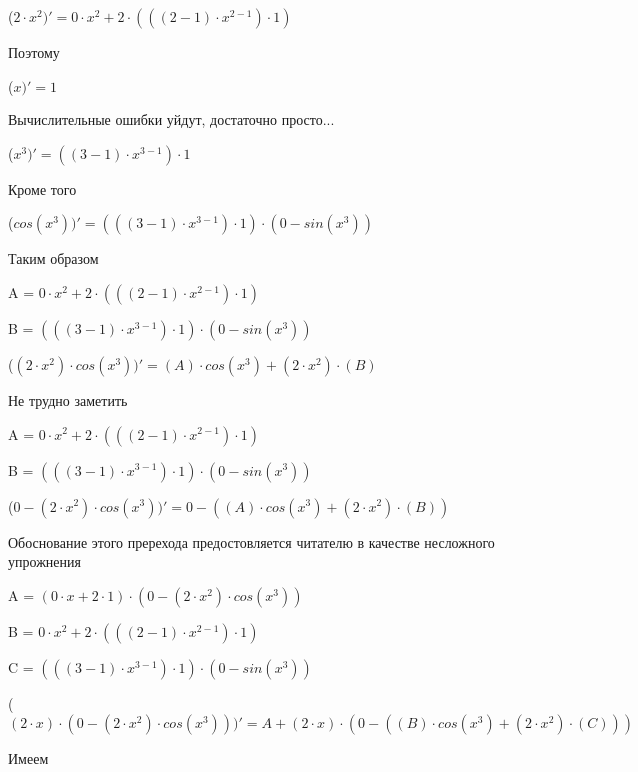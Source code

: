 \documentclass[12pt,a4paper,fleqn]{article}
\begin{document}
\begin{center}
 ($2 \cdot x^{2})'
  = 0 \cdot x^{2}+2 \cdot (((2-1) \cdot x^{2-1}) \cdot 1)$\end{center}
Поэтому

\begin{center}
 ($x)'
  = 1$\end{center}
Вычислительные ошибки уйдут, достаточно просто...

\begin{center}
 ($x^{3})'
  = ((3-1) \cdot x^{3-1}) \cdot 1$\end{center}
Кроме того

\begin{center}
 ($cos(x^{3}))'
  = (((3-1) \cdot x^{3-1}) \cdot 1) \cdot (0-sin(x^{3}))$\end{center}
Таким образом

\begin{center}
A = $0 \cdot x^{2}+2 \cdot (((2-1) \cdot x^{2-1}) \cdot 1)$\end{center}
\begin{center}
B = $(((3-1) \cdot x^{3-1}) \cdot 1) \cdot (0-sin(x^{3}))$\end{center}
\begin{center}
 ($(2 \cdot x^{2}) \cdot cos(x^{3}))'
  = (A) \cdot cos(x^{3})+(2 \cdot x^{2}) \cdot (B)$\end{center}
Не трудно заметить

\begin{center}
A = $0 \cdot x^{2}+2 \cdot (((2-1) \cdot x^{2-1}) \cdot 1)$\end{center}
\begin{center}
B = $(((3-1) \cdot x^{3-1}) \cdot 1) \cdot (0-sin(x^{3}))$\end{center}
\begin{center}
 ($0-(2 \cdot x^{2}) \cdot cos(x^{3}))'
  = 0-((A) \cdot cos(x^{3})+(2 \cdot x^{2}) \cdot (B))$\end{center}
Обоснование этого пререхода предостовляется читателю в качестве несложного упрожнения

\begin{center}
A = $(0 \cdot x+2 \cdot 1) \cdot (0-(2 \cdot x^{2}) \cdot cos(x^{3}))$\end{center}
\begin{center}
B = $0 \cdot x^{2}+2 \cdot (((2-1) \cdot x^{2-1}) \cdot 1)$\end{center}
\begin{center}
C = $(((3-1) \cdot x^{3-1}) \cdot 1) \cdot (0-sin(x^{3}))$\end{center}
\begin{center}
 ($(2 \cdot x) \cdot (0-(2 \cdot x^{2}) \cdot cos(x^{3})))'
  = A+(2 \cdot x) \cdot (0-((B) \cdot cos(x^{3})+(2 \cdot x^{2}) \cdot (C)))$\end{center}
Имеем
\end{document}
